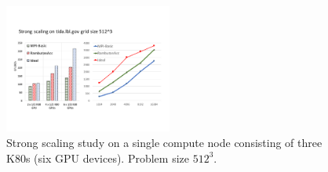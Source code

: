 \begin{figure}[htb]
\centering
\includegraphics[width=0.49\textwidth]{figures/stencil_tida.pdf}
\caption{Strong scaling study on a single compute node consisting of three K80s (six GPU devices). Problem size $512^3$.}
\label{stencil_onnode}
\end{figure}

